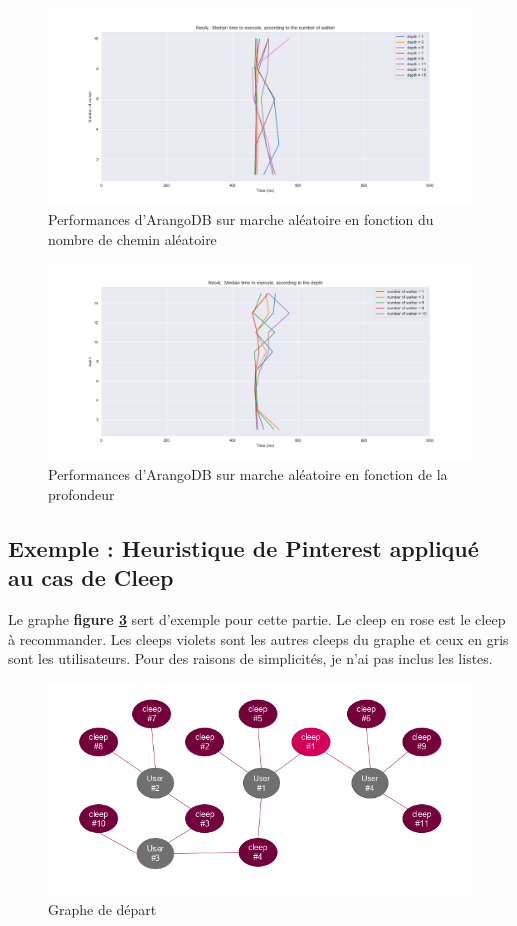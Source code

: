 \documentclass{article} %
\begin{document}
\begin{figure}[!h]
	\centering
	\includegraphics[keepaspectratio = true,scale=0.4]{neo4j_nbwalker_time.png}
	\caption{Performances d'ArangoDB sur marche aléatoire en fonction du nombre de chemin aléatoire}
	\label{fig:newalk}
\end{figure}


\begin{figure}[!h]
	\centering
	\includegraphics[keepaspectratio = true,scale=0.4]{neo4j_depth_time.png}
	\caption{Performances d'ArangoDB sur marche aléatoire en fonction de la profondeur}
	\label{fig:nedepth}
\end{figure}
\newpage
\subsection{Exemple : Heuristique de Pinterest appliqué au cas de Cleep}

Le graphe \textbf{figure \ref{fig:ex1}} sert d'exemple pour cette partie. Le cleep en rose est le cleep à recommander. Les cleeps violets sont les autres cleeps du graphe et ceux en gris sont les utilisateurs. Pour des raisons de simplicités, je n'ai pas inclus les listes.
\begin{figure}[!h]
	\centering
	\includegraphics[keepaspectratio = true,scale=0.6]{ex1}
	\caption{Graphe de départ}
	\label{fig:ex1}
\end{figure}
\end{document}
